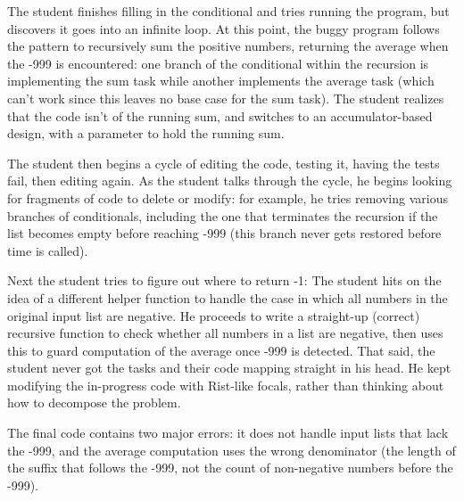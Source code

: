 The student finishes filling in the conditional and tries running the
program, but discovers it goes into an infinite loop.  At this point,
the buggy program follows the pattern to recursively sum the positive
numbers, returning the average when the -999 is encountered: one branch
of the conditional within the recursion is implementing the sum task
while another implements the average task (which can't work since this
leaves no base case for the sum task).  The student realizes that the
code isn't  of the running sum, and
switches to an accumulator-based design, with a parameter to hold the
running sum.

The student then begins a cycle of editing the code, testing it,
having the tests fail, then editing again. As the student talks
through the cycle, he begins looking for fragments of code to
delete or modify: for example, he tries removing various
branches of conditionals, including the one that terminates the
recursion if the list becomes empty before reaching -999 (this branch
never gets restored before time is called).

Next the student tries to figure out where to return -1:  
The student hits on the idea of a different helper function to handle
the case in which all numbers in the original input list are
negative. He proceeds to write a straight-up (correct) recursive
function to check whether all numbers in a list are negative, then
uses this to guard computation of the average once -999 is detected.
That said, the student never got the tasks and their code mapping straight
in his head.  He kept modifying the in-progress code with Rist-like
focals, rather than thinking about how to decompose the problem.

The final code contains two major errors: it does not handle input
lists that lack the -999, and the average computation uses the wrong
denominator (the length of the suffix that follows the -999, not the
count of non-negative numbers before the -999).



